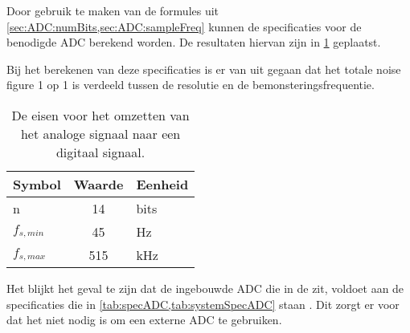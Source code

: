 Door gebruik te maken van de formules uit \cref{sec:ADC:numBits,sec:ADC:sampleFreq} kunnen de specificaties voor de benodigde ADC berekend worden. De resultaten hiervan zijn in  \cref{tab:specADC} geplaatst.

Bij het berekenen van deze specificaties is er van uit gegaan dat het totale noise figure 1 op 1 is verdeeld tussen de resolutie en de bemonsteringsfrequentie.
\begin{table}[!htbp]
    \centering
    \begin{tabular}{l|c|l}
        Symbol      & Waarde    & Eenheid\\\hline
        n           & 14        & bits\\
        $f_{s,min}$ & 45        & Hz\\
        $f_{s,max}$ & 515       & kHz\\
    \end{tabular}
    \caption{De eisen voor het omzetten van het analoge signaal naar een digitaal signaal.}
    \label{tab:specADC}
\end{table}

Het blijkt het geval te zijn dat de ingebouwde ADC die in de \mcu  zit, voldoet aan de specificaties die in \cref{tab:specADC,tab:systemSpecADC} staan \cite{nrf52810}. Dit zorgt er voor dat het niet nodig is om een externe ADC te gebruiken.


